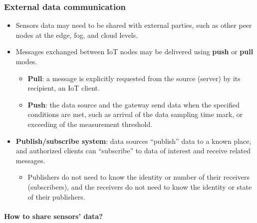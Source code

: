 \documentclass[
]{article}
\providecommand{\tightlist}{%
  \setlength{\itemsep}{0pt}\setlength{\parskip}{0pt}}
\begin{document}
\subsubsection{External data
communication}\label{external-data-communication}

\begin{itemize}
\tightlist
\item
  Sensors data may need to be shared with external parties, such as
  other peer nodes at the edge, fog, and cloud levels.
\item
  Messages exchanged between IoT nodes may be delivered using
  \textbf{push} or \textbf{pull} modes.

  \begin{itemize}
  \tightlist
  \item
    \textbf{Pull}: a message is explicitly requested from the source
    (server) by its recipient, an IoT client.
  \item
    \textbf{Push}: the data source and the gateway send data when the
    specified conditions are met, such as arrival of the data sampling
    time mark, or exceeding of the measurement threshold.
  \end{itemize}
\item
  \textbf{Publish/subscribe system}: data sources ``publish'' data to a
  known place, and authorized clients can ``subscribe'' to data of
  interest and receive related messages.

  \begin{itemize}
  \tightlist
  \item
    Publishers do not need to know the identity or number of their
    receivers (subscribers), and the receivers do not need to know the
    identity or state of their publishers.
  \end{itemize}
\end{itemize}

\paragraph{How to share sensors' data?}\label{how-to-share-sensors-data}
\end{document}
